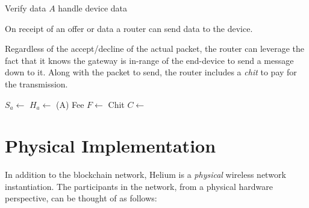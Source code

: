 \documentclass[letterpaper,11pt]{article}
\begin{document}
\begin{description}
\begin{algorithm}[!htb]
       {
        Verify data $A$ \;
        handle device data \;
      }
    \end{algorithm}
    \FloatBarrier


    \item [Send Data] On receipt of an offer or data a router can send data to the device.

      Regardless of the accept/decline of the actual packet, the router can leverage the fact that it knows the gateway is in-range of the end-device to send a message down to it. Along with the packet to send, the router includes a \emph{chit} to pay for the transmission.

    \begin{algorithm}[!htb]
      \DontPrintSemicolon
      \caption{Router Send Data }\label{proto:router.data.send}

       {
        $S_a \leftarrow $  \;
        $H_a \leftarrow $ \Hash(A) \;
        Fee $F \leftarrow $  \;
        Chit $C \leftarrow $  \;
         \;
      }
    \end{algorithm}
    \FloatBarrier


\end{description}

\section{Physical Implementation}

In addition to the blockchain network, Helium is a \emph{physical} wireless network instantiation. The participants in the network, from a physical hardware perspective, can be thought of as follows:
\end{document}
